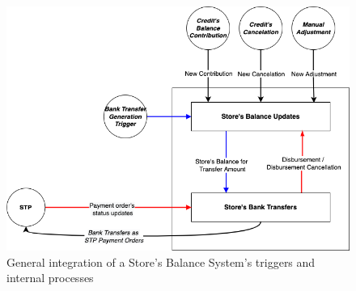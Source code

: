 \begin{figure} [H]
    \centering
    \includegraphics[scale = 0.5]{assets/diagrams/BalanceSystemDiagram.drawio.png}
    \caption{General integration of a Store's Balance System's triggers and internal processes}\label{fig:balance_systen_diaran}
\end{figure}